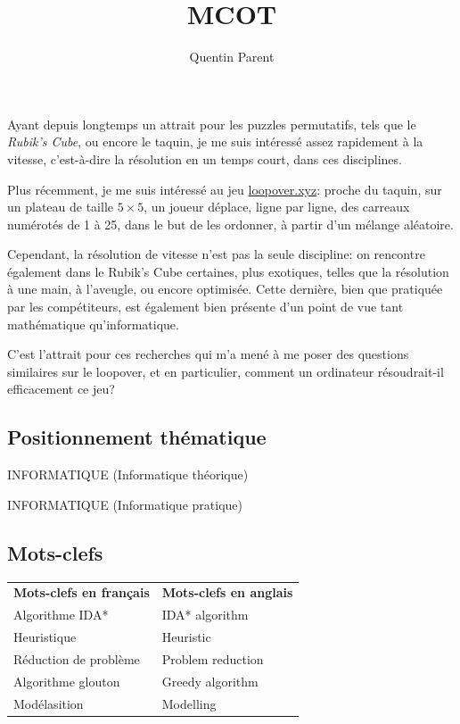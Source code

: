 \documentclass[a4paper, 12pt]{article}
\title{MCOT}
\date{}
\author{Quentin Parent}
\newcommand{\hreftwo}[1]{\href{#1}{#1}}
\begin{document}
	\maketitle

	Ayant depuis longtemps un attrait pour les puzzles permutatifs, tels que le \textit{Rubik's Cube}, ou encore le taquin, je me suis intéressé assez rapidement à la vitesse, c'est-à-dire la résolution en un temps court, dans ces disciplines.
	
	Plus récemment, je me suis intéressé au jeu \hreftwo{loopover.xyz}: proche du taquin, sur un plateau de taille $5\times 5$, un joueur déplace, ligne par ligne, des carreaux numérotés de 1 à 25, dans le but de les ordonner, à partir d'un mélange aléatoire.
	
	Cependant, la résolution de vitesse n'est pas la seule discipline: on rencontre également dans le Rubik's Cube certaines, plus exotiques, telles que la résolution à une main, à l'aveugle, ou encore optimisée.	Cette dernière, bien que pratiquée par les compétiteurs, est également bien présente d'un point de vue tant mathématique qu'informatique.

	C'est l'attrait pour ces recherches qui m'a mené à me poser des questions similaires sur le loopover, et en particulier, comment un ordinateur résoudrait-il efficacement ce jeu?
	
	\subsection*{Positionnement thématique}
	
	INFORMATIQUE (Informatique théorique)
	
	INFORMATIQUE (Informatique pratique) 
	
	\subsection*{Mots-clefs}
	\begin{longtable}{ l p{3in} } %
		\textbf{Mots-clefs en français} & \textbf{Mots-clefs en anglais} \\
		Algorithme IDA* & IDA* algorithm \\
		Heuristique & Heuristic \\
		Réduction de problème & Problem reduction \\
		Algorithme glouton & Greedy algorithm \\
		Modélasition & Modelling
	\end{longtable}
	
\end{document}
